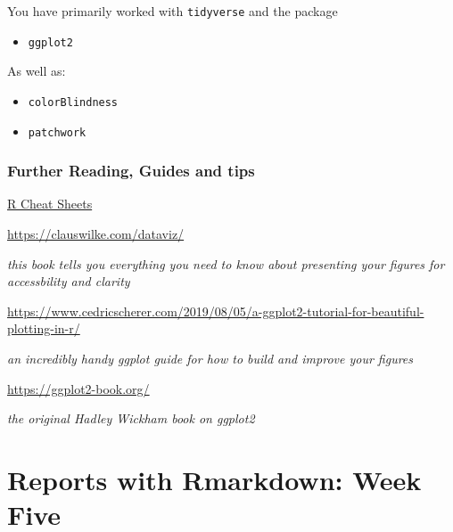\documentclass[
]{book}
\providecommand{\tightlist}{%
  \setlength{\itemsep}{0pt}\setlength{\parskip}{0pt}}
\begin{document}
You have primarily worked with \texttt{tidyverse} and the package

\begin{itemize}
\tightlist
\item
  \texttt{ggplot2} \citet{R-ggplot2}
\end{itemize}

As well as:

\begin{itemize}
\item
  \texttt{colorBlindness} \citet{R-colorBlindness}
\item
  \texttt{patchwork} \citet{R-patchwork}
\end{itemize}

\hypertarget{further-reading-guides-and-tips}{%
\subsection{Further Reading, Guides and tips}\label{further-reading-guides-and-tips}}

\href{https://www.rstudio.com/resources/cheatsheets/}{R Cheat Sheets}

\citet{dataviz} \url{https://clauswilke.com/dataviz/}

\emph{this book tells you everything you need to know about presenting your figures for accessbility and clarity}

\url{https://www.cedricscherer.com/2019/08/05/a-ggplot2-tutorial-for-beautiful-plotting-in-r/}

\emph{an incredibly handy ggplot guide for how to build and improve your figures}

\citet{ggplot} \url{https://ggplot2-book.org/}

\emph{the original Hadley Wickham book on ggplot2}

\hypertarget{reports-with-rmarkdown-week-five}{%
\chapter{Reports with Rmarkdown: Week Five}\label{reports-with-rmarkdown-week-five}}
\end{document}
